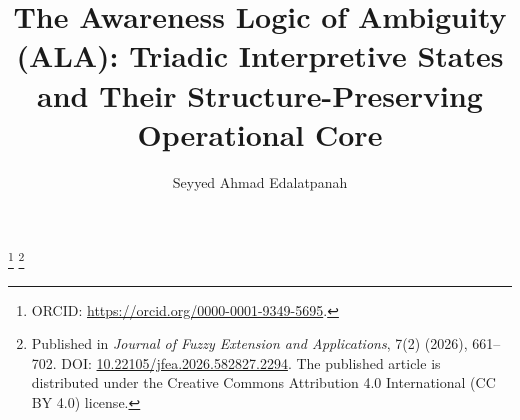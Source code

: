 \documentclass[reqno,final]{amsart}
\theoremstyle{definition}
\theoremstyle{plain}
\theoremstyle{remark}
\begin{document}
\raggedbottom

\title[The Awareness Logic of Ambiguity (ALA)]{The Awareness Logic of Ambiguity (ALA): Triadic Interpretive States and Their Structure-Preserving Operational Core}

\author{Seyyed Ahmad Edalatpanah}
\address{Department of Applied Mathematics, Artificial Intelligence Research Center, Ayandegan University, Tonekabon, Iran}
\thanks{ORCID: \url{https://orcid.org/0000-0001-9349-5695}.}
\thanks{Published in \emph{Journal of Fuzzy Extension and Applications}, 7(2) (2026), 661--702. DOI: \href{https://doi.org/10.22105/jfea.2026.582827.2294}{10.22105/jfea.2026.582827.2294}. The published article is distributed under the Creative Commons Attribution 4.0 International (CC BY 4.0) license.}
\date{}

\end{document}
